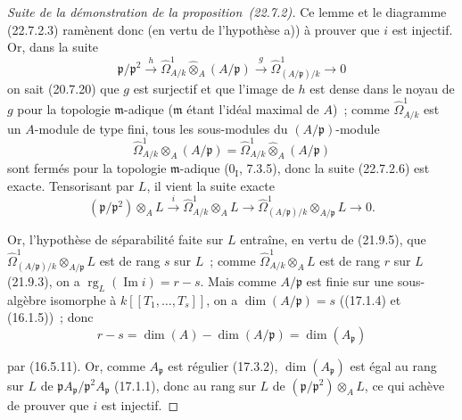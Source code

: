 \begin{proof}[Suite de la démonstration de la proposition~{\rm(22.7.2)}]
Ce lemme et le diagramme (22.7.2.3) ramènent donc (en vertu de l'hypothèse a))
à prouver que $i$ est injectif. Or, dans la suite
\begin{equation}
\label{0.22.7.2.6-fr}
  \mathfrak p/\mathfrak p^2\xrightarrow{h}
  \widehat\Omega^1_{A/k}\widehat\otimes_A(A/\mathfrak p)
  \xrightarrow{g}\widehat\Omega^1_{(A/\mathfrak p)/k}\longrightarrow0
  \tag{22.7.2.6}
\end{equation}
on sait (20.7.20) que $g$ est surjectif et que l'image de $h$ est dense dans
le noyau de $g$ pour la topologie $\mathfrak m$-adique ($\mathfrak m$ étant
l'idéal maximal de $A$)~; comme $\widehat\Omega^1_{A/k}$ est un $A$-module de
type fini, tous les sous-modules du $(A/\mathfrak p)$-module
\[
  \widehat\Omega^1_{A/k}\otimes_A(A/\mathfrak p)
  =\widehat\Omega^1_{A/k}\widehat\otimes_A(A/\mathfrak p)
\]
sont fermés pour la topologie $\mathfrak m$-adique ($0_{\mathrm I}$, 7.3.5),
donc la suite (22.7.2.6) est exacte. Tensorisant par $L$, il vient la suite
exacte
\[
  (\mathfrak p/\mathfrak p^2)\otimes_AL\xrightarrow{i}
  \widehat\Omega^1_{A/k}\otimes_AL\longrightarrow
  \widehat\Omega^1_{(A/\mathfrak p)/k}\otimes_{A/\mathfrak p}L
  \longrightarrow0.
\]

Or, l'hypothèse de séparabilité faite sur $L$ entraîne, en vertu de (21.9.5),
que $\widehat\Omega^1_{(A/\mathfrak p)/k}\otimes_{A/\mathfrak p}L$ est de
rang $s$ sur $L$~; comme $\widehat\Omega^1_{A/k}\otimes_AL$ est de rang $r$
sur $L$ (21.9.3), on a $\operatorname{rg}_L(\operatorname{Im}i)=r-s$. Mais comme
$A/\mathfrak p$ est finie sur une sous-algèbre isomorphe à
$k[[T_1,\ldots,T_s]]$, on a $\dim(A/\mathfrak p)=s$ ((17.1.4) et (16.1.5))~;
donc
\[
  r-s=\dim(A)-\dim(A/\mathfrak p)=\dim(A_{\mathfrak p})
\]


par (16.5.11). Or, comme $A_{\mathfrak p}$ est régulier (17.3.2),
$\dim(A_{\mathfrak p})$ est égal au rang sur $L$ de
$\mathfrak pA_{\mathfrak p}/\mathfrak p^2A_{\mathfrak p}$ (17.1.1), donc au
rang sur $L$ de $(\mathfrak p/\mathfrak p^2)\otimes_AL$, ce qui achève de
prouver que $i$ est injectif.
\end{proof}


